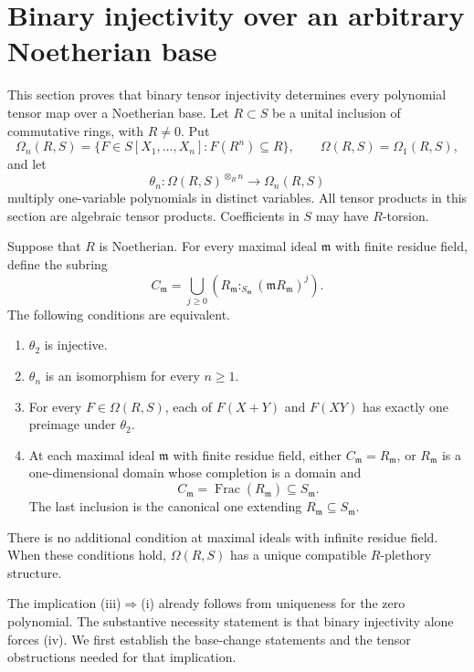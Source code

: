 \section{Binary injectivity over an arbitrary Noetherian base}
\label{sec:binary-injective-classification}

This section proves that binary tensor injectivity determines every
polynomial tensor map over a Noetherian base. Let $R\subset S$ be a
unital inclusion of commutative rings, with
$R\ne0$.  Put
\[
 \Omega_n(R,S)=\{F\in S[X_1,\ldots,X_n]:F(R^n)\subseteq R\},
 \qquad \Omega(R,S)=\Omega_1(R,S),
\]
and let
\[
 \theta_n:\Omega(R,S)^{\otimes_R n}\longrightarrow\Omega_n(R,S)
\]
multiply one-variable polynomials in distinct variables.  All tensor
products in this section are algebraic tensor products.  Coefficients
in $S$ may have $R$-torsion.

\begin{theorem}
\label{thm:binary-injective-classification}
Suppose that $R$ is Noetherian.  For every maximal ideal
$\mathfrak m$ with finite residue field, define the subring
\[
 C_{\mathfrak m}
 =\bigcup_{j\ge0}
   (R_{\mathfrak m}:_{S_{\mathfrak m}}
                    (\mathfrak mR_{\mathfrak m})^j).
\]
The following conditions are equivalent.
\begin{enumerate}[label=\textup{(\roman*)}]
\item $\theta_2$ is injective.
\item $\theta_n$ is an isomorphism for every $n\ge1$.
\item For every $F\in\Omega(R,S)$, each of $F(X+Y)$ and $F(XY)$
      has exactly one preimage under $\theta_2$.
\item At each maximal ideal $\mathfrak m$ with finite residue field,
      either $C_{\mathfrak m}=R_{\mathfrak m}$, or
      $R_{\mathfrak m}$ is a one-dimensional domain whose completion
      is a domain and
      \[
       C_{\mathfrak m}=\operatorname{Frac}(R_{\mathfrak m})
       \subseteq S_{\mathfrak m}.
      \]
      The last inclusion is the canonical one extending
      $R_{\mathfrak m}\subseteq S_{\mathfrak m}$.
\end{enumerate}
There is no additional condition at maximal ideals with infinite
residue field.  When these conditions hold, $\Omega(R,S)$ has a unique
compatible $R$-plethory structure.
\end{theorem}

The implication \textup{(iii)}$\Rightarrow$\textup{(i)} already follows
from uniqueness for the zero polynomial.  The substantive necessity
statement is that binary injectivity alone forces \textup{(iv)}.
We first establish the base-change statements and the tensor
obstructions needed for that implication.

